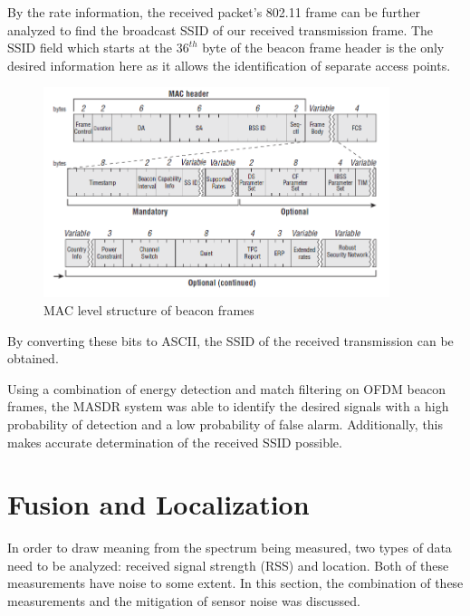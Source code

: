 By the rate information, the received packet's 802.11 frame can be further analyzed to find the broadcast SSID of our received transmission frame. The SSID field which starts at the $36^{th}$ byte of the beacon frame header is the only desired information here as it allows the identification of separate access points.
\begin{figure}[ht!]
	\centering
	\includegraphics[width=0.9\textwidth]{img/beacon_frame}
	\caption{MAC level structure of beacon frames\cite{beacon_frame}}
	\label{fig:beacon_frame}
\end{figure}\par
By converting these bits to ASCII, the SSID of the received transmission can be obtained. \par

Using a combination of energy detection and match filtering on OFDM beacon frames, the MASDR system was able to identify the desired signals with a high probability of detection and a low probability of false alarm. Additionally, this makes accurate determination of the received SSID possible.

\section{Fusion and Localization} \label{methods:kf}
In order to draw meaning from the spectrum being measured, two types of data need to be analyzed: received signal strength (RSS) and location. Both of these measurements have noise to some extent. In this section, the combination of these measurements and the mitigation of sensor noise was discussed. \par  

